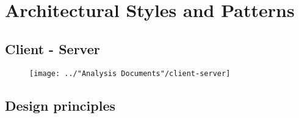 \section{Architectural Styles and Patterns}

\subsection{Client - Server}
\begin{figure}[H]
	\centering
	\texttt{[image: ../"Analysis Documents"/client-server]}
\end{figure}

\subsection{Design principles}